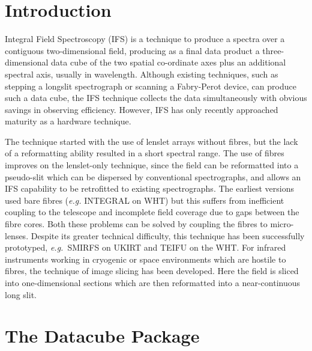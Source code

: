 \documentclass[twoside,11pt]{article}
\newcommand{\xlabel}[1]{}
\begin{document}
\section{\xlabel{sc16_intro}Introduction\label{sc16_intro}}

Integral Field Spectroscopy (IFS) is a technique to produce a spectra
over a contiguous two-dimensional field, producing as a final data
product a three-dimensional data cube of the two spatial co-ordinate
axes plus an additional spectral axis, usually in wavelength.  Although
existing techniques, such as stepping a longslit spectrograph or
scanning a Fabry-Perot device, can produce such a data cube, the IFS
technique collects the data simultaneously with obvious savings in
observing efficiency.  However, IFS has only recently approached
maturity as a hardware technique.

The technique started with the use of lenslet arrays without fibres,
but the lack of a reformatting ability resulted in a short spectral
range.  The use of fibres improves on the lenslet-only technique, since
the field can be reformatted into a pseudo-slit which can be
dispersed by conventional spectrographs, and allows an IFS capability
to be retrofitted to existing spectrographs.  The earliest versions
used bare fibres (\emph{e.g.} INTEGRAL on WHT) but this suffers from
inefficient coupling to the telescope and incomplete field coverage
due to gaps between the fibre cores.  Both these problems can be solved
by coupling the fibres to micro-lenses.  Despite its greater technical
difficulty, this technique has been successfully prototyped, \emph{e.g.}\
SMIRFS on UKIRT and TEIFU on the WHT.  For infrared instruments working
in cryogenic or space environments which are hostile to fibres, the
technique of image slicing has been developed.  Here the field is
sliced into one-dimensional sections which are then reformatted into a
near-continuous long slit.

\section{\xlabel{sc16_datacubepackage}The Datacube Package\label{sc16_datacubepackage}}
\end{document}
